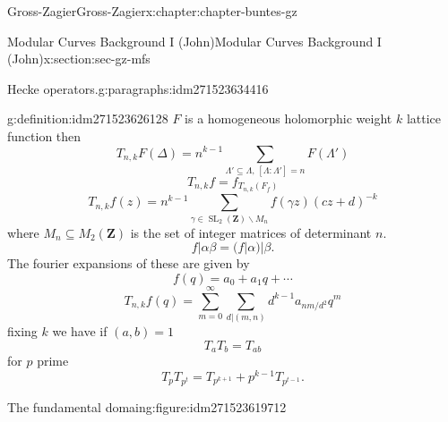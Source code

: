 \documentclass[oneside,10pt,]{book}
\numberwithin{equation}{section}
\newcommand{\ZZ}{\mathbf{Z}}
\DeclareMathOperator{\SL}{SL}
\begin{document}
\begin{chapterptx}{Gross-Zagier}{}{Gross-Zagier}{}{}{x:chapter:chapter-buntes-gz}
\begin{sectionptx}{Modular Curves Background I (John)}{}{Modular Curves Background I (John)}{}{}{x:section:sec-gz-mfs}
\begin{paragraphs}{Hecke operators.}{g:paragraphs:idm271523634416}
\begin{definition}{}{g:definition:idm271523626128}
\(F\) is a homogeneous holomorphic weight \(k\) lattice function then%
\begin{equation*}
T_{n,k} F(\Delta ) = n^{k-1} \sum_{\Lambda ' \subseteq \Lambda ,\,[\Lambda : \Lambda '] = n} F(\Lambda ')
\end{equation*}
%
\begin{equation*}
T_{n,k}f = f_{T_{n,k}(F_f)}
\end{equation*}
%
\begin{equation*}
T_{n,k} f(z) = n^{k-1} \sum_{\gamma \in \SL_2(\ZZ)\backslash  M_n } f(\gamma  z)(cz+d)^{-k}
\end{equation*}
where \(M_n \subseteq  M_2(\ZZ)\) is the set of integer matrices of determinant \(n\).%
\begin{equation*}
f|\alpha \beta = (f|\alpha )|\beta \text{.}
\end{equation*}
The fourier expansions of these are given by%
\begin{equation*}
f(q) = a_0 + a_1 q + \cdots
\end{equation*}
%
\begin{equation*}
T_{n,k}f(q) = \sum_{m = 0}^\infty \sum_{d|(m,n)} d^{k-1} a_{nm/d^2} q^m
\end{equation*}
fixing \(k\) we have if \((a,b) = 1\)%
\begin{equation*}
T_aT_b = T_{ab}
\end{equation*}
for \(p \) prime%
\begin{equation*}
T_p T_{p^t} = T_{p^{k+1}} + p^{k-1} T_{p^{t-1}}\text{.}
\end{equation*}
%
\end{definition}
\begin{figureptx}{The fundamental domain}{g:figure:idm271523619712}{}%
\begin{image}{0}{1}{0}%
\end{image}
\end{figureptx}
\end{paragraphs}
\end{sectionptx}
\end{chapterptx}
\end{document}
